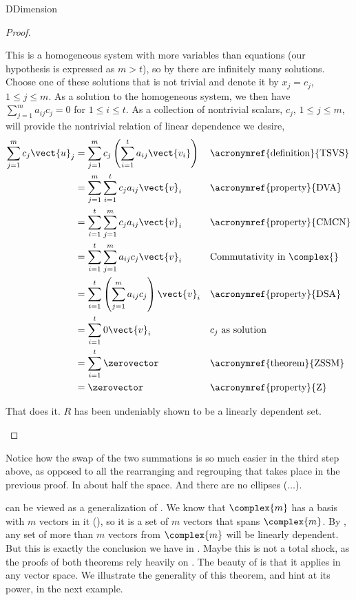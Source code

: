 \begin{subsect}{D}{Dimension}
\begin{proof}
%
\begin{para}This is a homogeneous system with more variables than equations (our hypothesis is expressed as $m>t$), so by  there are infinitely many solutions.  Choose one of these solutions that is not trivial and denote it by $x_j=c_j$, $1\leq j\leq m$.  As a solution to the homogeneous system, we then have $\sum_{j=1}^{m}a_{ij}c_{j}=0$ for $1\leq i\leq t$.  As a collection of nontrivial scalars, $c_j$, $1\leq j\leq m$, will provide the nontrivial relation of linear dependence we desire,
%
\begin{align*}
\sum_{j=1}^{m}c_{j}\vect{u}_j
&=\sum_{j=1}^{m}c_{j}\left(\sum_{i=1}^{t}a_{ij}\vect{v_i}\right)
&&\text{\acronymref{definition}{TSVS}}\\
%
&=\sum_{j=1}^{m}\sum_{i=1}^{t}c_{j}a_{ij}\vect{v}_i
&&\text{\acronymref{property}{DVA}}\\
%
&=\sum_{i=1}^{t}\sum_{j=1}^{m}c_{j}a_{ij}\vect{v}_i
&&\text{\acronymref{property}{CMCN}}\\
%
&=\sum_{i=1}^{t}\sum_{j=1}^{m}a_{ij}c_{j}\vect{v}_i
&&\text{Commutativity in $\complex{}$}\\
%
&=\sum_{i=1}^{t}\left(\sum_{j=1}^{m}a_{ij}c_{j}\right)\vect{v}_i
&&\text{\acronymref{property}{DSA}}\\
%
&=\sum_{i=1}^{t}0\vect{v}_i
&&\text{$c_j$ as solution}\\
%
&=\sum_{i=1}^{t}\zerovector
&&\text{\acronymref{theorem}{ZSSM}}\\
%
&=\zerovector
&&\text{\acronymref{property}{Z}}
%
\end{align*}
\end{para}
%
\begin{para}That does it.  $R$ has been undeniably shown to be a linearly dependent set.\end{para}
\end{proof}
%
\begin{para}Notice how the swap of the two summations is so much easier in the third step above, as opposed to all the rearranging and regrouping that takes place in the previous proof.  In about half the space.  And there are no ellipses ($\ldots$).\end{para}
%
\begin{para} can be viewed as a generalization of .  We know that $\complex{m}$ has a basis with $m$ vectors in it (), so it is a set of $m$ vectors that spans $\complex{m}$.  By , any set of more than $m$ vectors from $\complex{m}$ will be linearly dependent.  But this is exactly the conclusion we have in .  Maybe this is not a total shock, as the proofs of both theorems rely heavily on .   The beauty of  is that it applies in any vector space.  We illustrate the generality of this theorem, and hint at its power, in the next example.\end{para}

\end{subsect}
